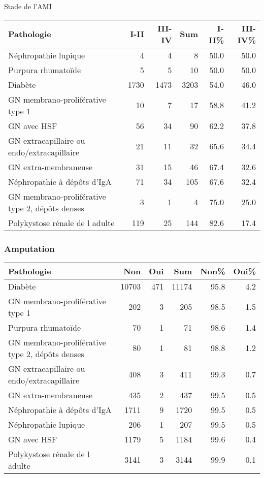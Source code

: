 \documentclass[11pt,a4paper]{article}\usepackage[]{graphicx}\usepackage[]{color}
\begin{document}
Stade de l’AMI

\begin{table}[H]
\centering
\begin{tabular}{lrrrrr}
  \hline
Pathologie & I-II & III-IV & Sum & I-II\% & III-IV\% \\ 
  \hline
Néphropathie lupique &  4 &  4 &  8 & 50.0 & 50.0 \\ 
  Purpura rhumatoïde &  5 &  5 & 10 & 50.0 & 50.0 \\ 
  Diabète & 1730 & 1473 & 3203 & 54.0 & 46.0 \\ 
  GN membrano-proliférative type 1 & 10 &  7 & 17 & 58.8 & 41.2 \\ 
  GN avec HSF & 56 & 34 & 90 & 62.2 & 37.8 \\ 
  GN extracapillaire ou endo/extracapillaire & 21 & 11 & 32 & 65.6 & 34.4 \\ 
  GN extra-membraneuse & 31 & 15 & 46 & 67.4 & 32.6 \\ 
  Néphropathie à dépôts d'IgA & 71 & 34 & 105 & 67.6 & 32.4 \\ 
  GN membrano-proliférative type 2, dépôts denses &  3 &  1 &  4 & 75.0 & 25.0 \\ 
  Polykystose rénale de l adulte & 119 & 25 & 144 & 82.6 & 17.4 \\ 
   \hline
\end{tabular}
\end{table}


\subsubsection*{Amputation}

\begin{table}[H]
\centering
\begin{tabular}{lrrrrr}
  \hline
Pathologie & Non & Oui & Sum & Non\% & Oui\% \\ 
  \hline
Diabète & 10703 & 471 & 11174 & 95.8 & 4.2 \\ 
  GN membrano-proliférative type 1 & 202 &  3 & 205 & 98.5 & 1.5 \\ 
  Purpura rhumatoïde & 70 &  1 & 71 & 98.6 & 1.4 \\ 
  GN membrano-proliférative type 2, dépôts denses & 80 &  1 & 81 & 98.8 & 1.2 \\ 
  GN extracapillaire ou endo/extracapillaire & 408 &  3 & 411 & 99.3 & 0.7 \\ 
  GN extra-membraneuse & 435 &  2 & 437 & 99.5 & 0.5 \\ 
  Néphropathie à dépôts d'IgA & 1711 &  9 & 1720 & 99.5 & 0.5 \\ 
  Néphropathie lupique & 206 &  1 & 207 & 99.5 & 0.5 \\ 
  GN avec HSF & 1179 &  5 & 1184 & 99.6 & 0.4 \\ 
  Polykystose rénale de l adulte & 3141 &  3 & 3144 & 99.9 & 0.1 \\ 
   \hline
\end{tabular}
\end{table}
\end{document}
